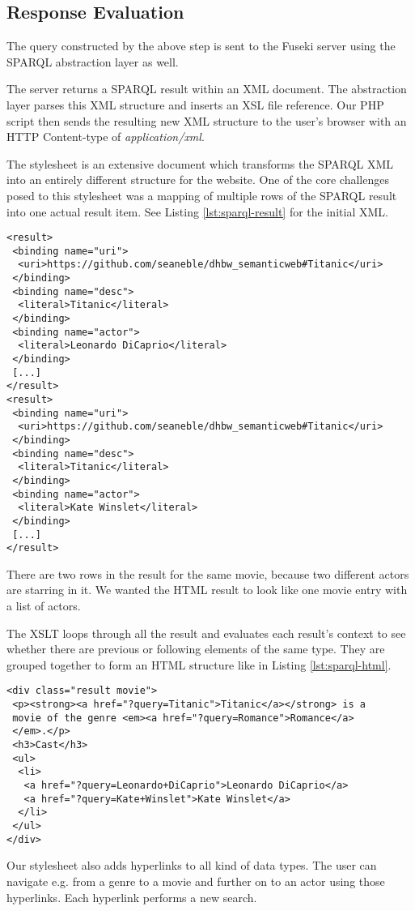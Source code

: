 \subsection{Response Evaluation}
The query constructed by the above step is sent to the Fuseki server using the SPARQL abstraction layer as well.

The server returns a SPARQL result within an XML document. The abstraction layer parses this XML structure and inserts an XSL file reference. Our PHP script then sends the resulting new XML structure to the user's browser with an HTTP Content-type of \textit{application/xml}.

The stylesheet is an extensive document which transforms the SPARQL XML into an entirely different structure for the website. One of the core challenges posed to this stylesheet was a mapping of multiple rows of the SPARQL result into one actual result item. See Listing \ref{lst:sparql-result} for the initial XML.

\begin{lstlisting}[caption={XML extract returned by the server when searching for a movie},label={lst:sparql-result}]
<result>
 <binding name="uri">
  <uri>https://github.com/seaneble/dhbw_semanticweb#Titanic</uri>
 </binding>
 <binding name="desc">
  <literal>Titanic</literal>
 </binding>
 <binding name="actor">
  <literal>Leonardo DiCaprio</literal>
 </binding>
 [...]
</result>
<result>
 <binding name="uri">
  <uri>https://github.com/seaneble/dhbw_semanticweb#Titanic</uri>
 </binding>
 <binding name="desc">
  <literal>Titanic</literal>
 </binding>
 <binding name="actor">
  <literal>Kate Winslet</literal>
 </binding>
 [...]
</result>
\end{lstlisting}

There are two rows in the result for the same movie, because two different actors are starring in it. We wanted the HTML result to look like one movie entry with a list of actors.

The XSLT loops through all the result and evaluates each result's context to see whether there are previous or following elements of the same type. They are grouped together to form an HTML structure like in Listing \ref{lst:sparql-html}.

\begin{lstlisting}[caption={HTML structure for one movie result},label={lst:sparql-html}]
<div class="result movie">
 <p><strong><a href="?query=Titanic">Titanic</a></strong> is a
 movie of the genre <em><a href="?query=Romance">Romance</a>
 </em>.</p>
 <h3>Cast</h3>
 <ul>
  <li>
   <a href="?query=Leonardo+DiCaprio">Leonardo DiCaprio</a>
   <a href="?query=Kate+Winslet">Kate Winslet</a>
  </li>
 </ul>
</div>
\end{lstlisting}

Our stylesheet also adds hyperlinks to all kind of data types. The user can navigate e.g. from a genre to a movie and further on to an actor using those hyperlinks. Each hyperlink performs a new search.